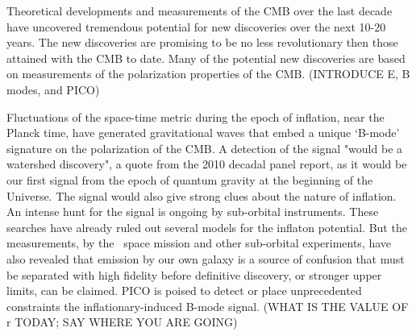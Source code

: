 \documentclass[PICOReport.tex]{subfiles}
\begin{document}

Theoretical developments and measurements of the \ac{CMB} over the last decade 
have uncovered tremendous potential for new discoveries over the next 10-20 years. The new discoveries are promising to be 
no less revolutionary then those attained with the CMB to date. Many of the potential new discoveries are based on 
measurements of the polarization properties of the \ac{CMB}.  (INTRODUCE E, B modes, and PICO)

Fluctuations of the space-time metric during the epoch of inflation, near the Planck time, have generated gravitational waves that embed a 
unique `B-mode' signature on the polarization of the CMB. A detection of the signal "would be a watershed discovery", a quote
from the 2010 decadal panel report, as it would be our first signal from the epoch of quantum gravity at the beginning of the Universe. 
The signal would also give strong clues about the nature of inflation. 
An intense hunt for the signal is ongoing by sub-orbital instruments. These searches have already ruled out several 
models for the inflaton potential. But the measurements, by the \planck\ space mission and other sub-orbital experiments, have also 
revealed that emission by our own galaxy is a source of confusion that must be separated with high fidelity before definitive discovery, or 
stronger upper limits, can be claimed. PICO is poised to detect or place unprecedented constraints the inflationary-induced 
B-mode signal. (WHAT IS THE VALUE OF r TODAY; SAY WHERE YOU ARE GOING)
\end{document}
